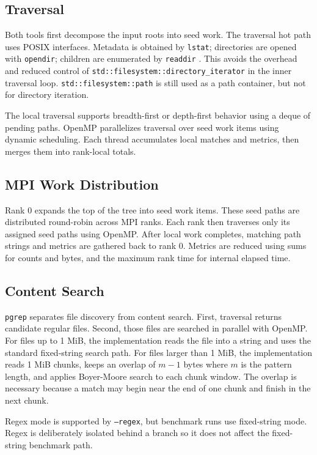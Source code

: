 \documentclass[twocolumn,10pt]{asme2e}
\begin{document}
\subsection*{Traversal}

Both tools first decompose the input roots into seed work. The traversal hot path uses POSIX interfaces. Metadata is obtained by \texttt{lstat}; directories are opened with \texttt{opendir}; children are enumerated by \texttt{readdir} \cite{posix_readdir}. This avoids the overhead and reduced control of \texttt{std::filesystem::directory\_iterator} in the inner traversal loop. \texttt{std::filesystem::path} is still used as a path container, but not for directory iteration.

The local traversal supports breadth-first or depth-first behavior using a deque of pending paths. OpenMP parallelizes traversal over seed work items using dynamic scheduling. Each thread accumulates local matches and metrics, then merges them into rank-local totals.

\subsection*{MPI Work Distribution}

Rank 0 expands the top of the tree into seed work items. These seed paths are distributed round-robin across MPI ranks. Each rank then traverses only its assigned seed paths using OpenMP. After local work completes, matching path strings and metrics are gathered back to rank 0. Metrics are reduced using sums for counts and bytes, and the maximum rank time for internal elapsed time.

\subsection*{Content Search}

\texttt{pgrep} separates file discovery from content search. First, traversal returns candidate regular files. Second, those files are searched in parallel with OpenMP. For files up to 1 MiB, the implementation reads the file into a string and uses the standard fixed-string search path. For files larger than 1 MiB, the implementation reads 1 MiB chunks, keeps an overlap of $m-1$ bytes where $m$ is the pattern length, and applies Boyer-Moore search to each chunk window. The overlap is necessary because a match may begin near the end of one chunk and finish in the next chunk.

Regex mode is supported by \texttt{--regex}, but benchmark runs use fixed-string mode. Regex is deliberately isolated behind a branch so it does not affect the fixed-string benchmark path.
\end{document}
